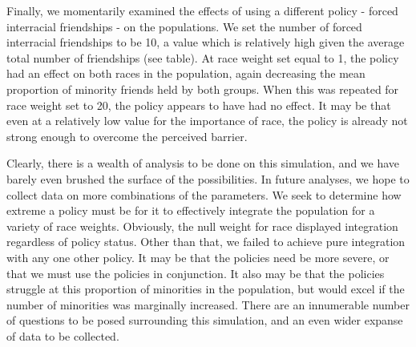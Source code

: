 Finally, we momentarily examined the effects of using a different policy - forced interracial friendships - on the 
populations. We set the number of forced interracial friendships to be 10, a value which is relatively high given the average total number of friendships (see table). At race weight 
set equal to 1, the policy had an effect on both races in the population, again decreasing the mean proportion of minority friends held by both groups. When this was repeated for race 
weight set to 20, the policy appears to have had no effect. It may be that even at a relatively low value for the importance of race, the policy is already not strong enough to overcome 
the perceived barrier.

Clearly, there is a wealth of analysis to be done on this simulation, and we have barely even brushed the surface of the 
possibilities. In future analyses, we hope to collect data on more combinations of the parameters. We seek to determine how 
extreme a policy must be for it to effectively integrate the population for a variety of race weights. Obviously, the null 
weight for race displayed integration regardless of policy status. Other than that, we failed to achieve pure integration 
with any one other policy. It may be that the policies need be more severe, or that we must use the policies in 
conjunction. It also may be that the policies struggle at this proportion of minorities in the population, but would 
excel if the number of minorities was marginally increased. There are an innumerable number of questions to be posed 
surrounding this simulation, and an even wider expanse of data to be collected.
